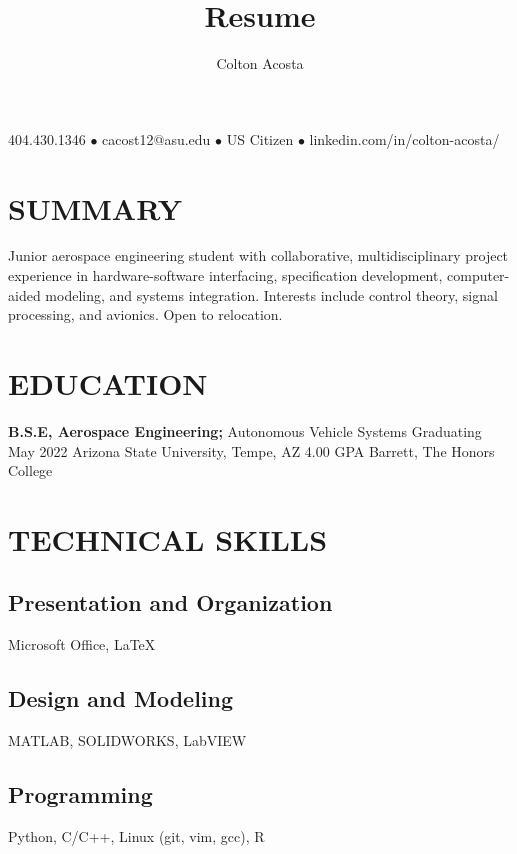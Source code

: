 \documentclass{article}
\makeatletter
\renewcommand{\maketitle}{
	\begin{center}
		{\huge\bfseries
			\theauthor}
			
		404.430.1346 $\bullet$ cacost12@asu.edu $\bullet$ US Citizen $\bullet$ linkedin.com/in/colton-acosta/
	\end{center}
}
\makeatother
\begin{document}
\title{Resume}
\author{Colton Acosta}
\maketitle
\section{SUMMARY}
Junior aerospace engineering student with collaborative, multidisciplinary project experience in hardware-software interfacing, specification development, computer-aided modeling, and systems integration. Interests include control theory, signal processing, and avionics. Open to relocation. 
\section{EDUCATION}
\textbf{B.S.E, Aerospace Engineering;} Autonomous Vehicle Systems
\hfill 
Graduating May 2022
\linebreak
Arizona State University, Tempe, AZ 
\hfill
4.00 GPA
\linebreak
Barrett, The Honors College

\section{TECHNICAL SKILLS}
\subsection{Presentation and Organization}
Microsoft Office,  {\LaTeX}
\subsection{Design and Modeling}
MATLAB, SOLIDWORKS, LabVIEW
\subsection{Programming} 
Python, C/C++, Linux (git, vim, gcc), R
\end{document}
